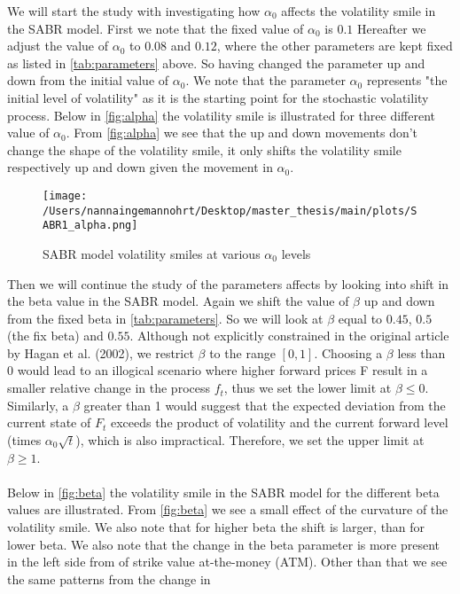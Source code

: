 We will start the study with investigating how $\alpha_0$ affects the volatility smile in the SABR model. 
First we note that the fixed value of $\alpha_0$ is $0.1$ Hereafter we adjust the value of $\alpha_0$ to $0.08$ and $0.12$,
where the other parameters are kept fixed as listed in \autoref{tab:parameters} above. So having changed the parameter
up and down from the initial value of $\alpha_0$.
We note that the parameter $\alpha_0$
represents "the initial level of volatility" as it is the starting point for the stochastic volatility process. 
Below in \autoref{fig:alpha} the volatility smile is illustrated for three different value of $\alpha_0$. 
From \autoref{fig:alpha} we see that the up and down movements don't change the shape of the volatility smile, 
it only shifts the volatility smile respectively up and down given the movement in $\alpha_0$.
\begin{figure}[H]
    \centering
    \texttt{[image: /Users/nannaingemannohrt/Desktop/master\_thesis/main/plots/SABR1\_alpha.png]}
    \caption{SABR model volatility smiles at various $\alpha_0$ levels}
    \label{fig:alpha}
\end{figure}
\noindent
Then we will continue the study of the parameters affects by looking into shift in the beta value in the SABR model.
Again we shift the value of $\beta$ up and down from the fixed beta in \autoref{tab:parameters}. So we will look at $\beta$ equal to $0.45$,
$0.5$ (the fix beta) and $0.55$. 
Although not explicitly constrained in the original article by Hagan et al. (2002), we restrict $\beta$ to the range $[0, 1]$. 
Choosing a $\beta$ less than 0 would lead to an illogical scenario where higher forward prices F result in a smaller 
relative change in the process $f_t$, thus we set the lower limit at $\beta \leq 0$. Similarly, a $\beta$ greater than 1 would 
suggest that the expected deviation from the current state of $F_t$ exceeds the product of volatility and the current 
forward level (times $\alpha_0 \sqrt{t}$), which is also impractical. Therefore, we set the upper limit at $\beta \geq 1$.
\\\\
Below in \autoref{fig:beta} the volatility smile in the SABR model for the different beta values are illustrated.
From \autoref{fig:beta} we see a small effect of the curvature of the volatility smile. We also note that for higher 
beta the shift is larger, than for lower beta. We also note that the change in the beta parameter is more present in 
the left side from of strike value at-the-money (ATM). Other than that we see the same patterns from the change in 
